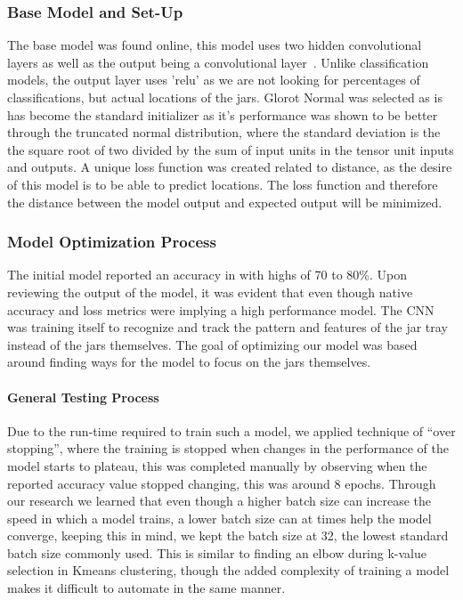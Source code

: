 \documentclass[11pt]{article}
\begin{document}
            \subsubsection{Base Model and Set-Up}
                The base model was found online, this model uses two hidden convolutional layers as well as the output being a convolutional layer~\cite{saif}. Unlike classification models, the output layer uses 'relu' as we are not looking for percentages of classifications, but actual locations of the jars. Glorot Normal was selected as is has become the standard initializer as it's performance was shown to be better through the truncated normal distribution, where the standard deviation is the the square root of two divided by the sum of input units in the tensor unit inputs and outputs. A unique loss function was created related to distance, as the desire of this model is to be able to predict locations. The loss function and therefore the distance between the model output and expected output will be minimized.

            \subsubsection{Model Optimization Process}
                The initial model reported an accuracy in with highs of 70 to 80\%. Upon reviewing the output of the model, it was evident that even though native accuracy and loss metrics were implying a high performance model. The CNN was training itself to recognize and track the pattern and features of the jar tray instead of the jars themselves. The goal of optimizing our model was based around finding ways for the model to focus on the jars themselves.

                \paragraph{General Testing Process}
                    Due to the run-time required to train such a model, we applied technique of ``over stopping'', where the training is stopped when changes in the performance of the model starts to plateau, this was completed manually by observing when the reported accuracy value stopped changing, this was around 8 epochs. Through our research we learned that even though a higher batch size can increase the speed in which a model trains, a lower batch size can at times help the model converge, keeping this in mind, we kept the batch size at 32, the lowest standard batch size commonly used. This is similar to finding an elbow during k-value selection in Kmeans clustering, though the added complexity of training a model makes it difficult to automate in the same manner.
\end{document}

